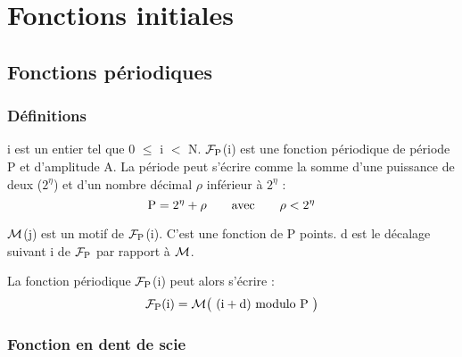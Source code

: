 
\chapter{Fonctions initiales}

\section{Fonctions périodiques}
\subsection{Définitions}
i est un entier tel que 0 $\leqslant$ i $<$ N. $\mathcal{F}_{\text{P}}$(i) est une fonction périodique de période P et d'amplitude A. La période peut s'écrire comme la somme d'une puissance de deux ($2^\eta$)
et d'un nombre décimal $\rho$ inférieur à $2^\eta$ :
\[
\text{P}=2^\eta+\rho\qquad\text{avec}\qquad\rho<2^\eta
\]

$\mathcal{M}$(j) est un motif de $\mathcal{F}_{\text{P}}$(i). C'est une fonction de P
points. d est le décalage suivant i de $\mathcal{F}_{\text{P}}$ par rapport à $\mathcal{M}$.

La fonction périodique $\mathcal{F}_{\text{P}}$(i) peut alors s'écrire :
\[
\mathcal{F}_{\text{P}}\text{(i)}=\mathcal{M}\big(\text{ (i}+\text{d) modulo P }\big)
\]

\subsection{Fonction en dent de scie}

\begin{center}  \end{center}

